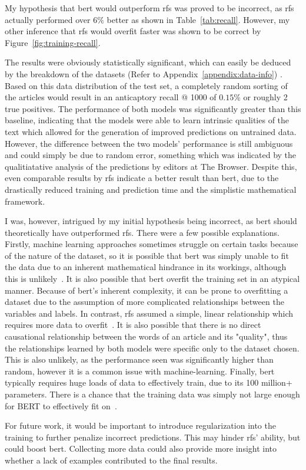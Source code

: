 My hypothesis that \acrshort{bert} would outperform \acrshort{rfs} was proved to be incorrect, as \acrshort{rfs} actually performed over $6\%$ better as shown in Table~\ref{tab:recall}. However, my other inference that \acrlong{rfs} would overfit faster was shown to be correct by Figure~\ref{fig:training-recall}.

The results were obviously statistically significant, which can easily be deduced by the breakdown of the datasets (Refer to Appendix~\ref{appendix:data-info})
. Based on this data distribution of the test set, a completely random sorting of the articles would result in an anticaptory recall @ 1000 of $0.15\%$ or roughly 2 true positives. The performance of both models was significantly greater than this baseline, indicating that the models were able to learn intrinsic qualities of the text which allowed for the generation of improved predictions on untrained data. However, the difference between the two models' performance is still ambiguous and could simply be due to random error, something which was indicated by the qualitiatative analysis of the predictions by editors at The Browser. Despite this, even comparable results by \acrshort{rfs} indicate a better result than \acrshort{bert}, due to the drastically reduced training and prediction time and the simplistic mathematical framework.


I was, however, intrigued by my initial hypothesis being incorrect, as \acrshort{bert} should theoretically have outperformed \acrshort{rfs}. There were a few possible explanations. Firstly, machine learning approaches sometimes struggle on certain tasks because of the nature of the dataset, so it is possible that \acrshort{bert} was simply unable to fit the data due to an inherent mathematical hindrance in its workings, although this is unlikely~\parencite{domingos2012few}. It is also possible that \acrshort{bert} overfit the training set in an atypical manner. Because of \acrshort{bert}'s inherent complexity, it can be prone to overfitting a dataset due to the assumption of more complicated relationships between the variables and labels. In contrast, \acrlong{rfs} assumed a simple, linear relationship which requires more data to overfit~\parencite{domingos2012few}. It is also possible that there is no direct causational relationship between the words of an article and its "quality", thus the relationships learned by both models were specific only to the dataset chosen. This is also unlikely, as the performance seen was significantly higher than random, however it is a common issue with machine-learning. Finally, \acrshort{bert} typically requires huge loads of data to effectively train, due to its 100 million+ parameters. There is a chance that the training data was simply not large enough for BERT to effectively fit on~\parencite{gonzlezcarvajal2020comparing}.

For future work, it would be important to introduce regularization into the training to further penalize incorrect predictions. This may hinder \acrshort{rfs}' ability, but could boost \acrshort{bert}. Collecting more data could also provide more insight into whether a lack of examples contributed to the final results.